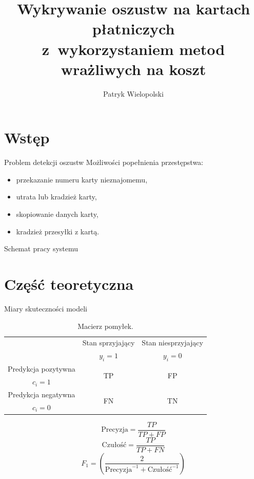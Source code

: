\documentclass{beamer}
\title{Wykrywanie oszustw na kartach płatniczych \\z~wykorzystaniem metod wrażliwych na koszt}
\institute{Promotor: dr inż. Andrzej Giniewicz \hfill Wydział Matematyki Politechniki Wrocławskiej}
\author{Patryk Wielopolski}
\begin{document}
	
	\newcommand{\htx}{h_{\theta}(\boldsymbol{x_i})}
	\newcommand{\es}{\mathcal{S}}
	\newcommand{\ef}{\mathcal{F}}
	\newcommand{\ku}{\mathcal{Q}}
	\newcommand{\iks}{\boldsymbol{x}}
	\newcommand{\yht}[1]{\hat{y_i}^{(#1)}}
	\newcommand{\ytrue}{\boldsymbol{y}}

\section{Wstęp}

\begin{frame}{Problem detekcji oszustw}
	Możliwości popełnienia przestępstwa:
	\begin{itemize}
		\item przekazanie numeru karty nieznajomemu,
		\item utrata lub kradzież karty,
		\item skopiowanie danych karty,
		\item kradzież przesyłki z kartą.
	\end{itemize}
\end{frame}

\begin{frame}{Schemat pracy systemu}
	
\end{frame}

\section{Część teoretyczna}

\begin{frame}{Miary skuteczności modeli}
	\begin{table}[h]
		\begin{center}
			\begin{tabular}{c|c|c}
				\multirow{2}{8em}{} & Stan sprzyjający & Stan niesprzyjający \\
				& $y_i = 1$            & $y_i = 0$ \\
				\hline
				Predykcja pozytywna & \multirow{2}{8em}{\centering TP}& \multirow{2}{8em}{\centering FP} \\
				$c_i = 1$ &  &                 \\
				\hline
				Predykcja negatywna & \multirow{2}{8em}{\centering FN} & \multirow{2}{8em}{\centering TN} \\
				$c_i = 0$ &  &  \\
			\end{tabular}
		\end{center}
		\caption{Macierz pomyłek.}
		\label{tab:macierz-pomylek}
	\end{table}
	$$ \text{Precyzja} = \frac{TP}{TP + FP} $$ 
	$$ \text{Czułość}= \frac{TP}{TP + FN} $$
	$$ F_1 = \left(\frac{2}{\text{Precyzja}^{-1} + \text{Czułość}^{-1}}\right) $$
\end{frame}
\end{document}
